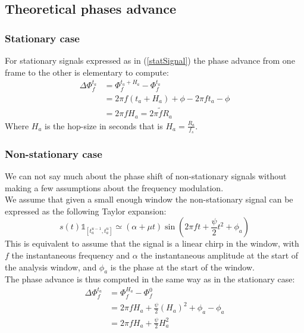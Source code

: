 \documentclass[]{article}
\begin{document}
\subsection{Theoretical phases advance}\label{theoretical_phase_advance}
\subsubsection{Stationary case}
For stationary signals expressed as in (\ref{statSignal}) the phase advance from one frame to the other is elementary to compute:
\begin{equation}\label{phaseAdvanceStat}
\begin{split}
\Delta \Phi_{f}^{t_a} & = \Phi_{f}^{t_a + H_a} - \Phi_{f}^{t_a}\\
& = 2\pi f (t_a + H_a) + \phi - 2\pi f t_a - \phi\\
& = 2\pi f H_a = 2\pi \tilde{f} R_a
\end{split}
\end{equation}
Where $H_a$ is the hop-size in seconds that is $H_a = \frac{R_a}{f_s}$.
\subsubsection{Non-stationary case}
We can not say much about the phase shift of non-stationary signals without making a few assumptions about the frequency modulation.\\
We assume that given a small enough window the non-stationary signal can be expressed as the following Taylor expansion:
\begin{equation}
s(t) \mathds{1}_{[t_a^{u-1}, t_a^u]} \simeq (\alpha + \mu t) \sin(2\pi f t + \frac{\psi}{2} t^2 + \phi_a)
\end{equation}
This is equivalent to assume that the signal is a linear chirp in the window, with $f$ the instantaneous frequency and $\alpha$ the instantaneous amplitude at the start of the analysis window, and $\phi_a$ is the phase at the start of the window.\\
The phase advance is thus computed in the same way as in the stationary case:
\begin{equation}\label{phaseadvanceNonStat}
\begin{split}
\Delta \Phi_{f}^{t_a} & = \Phi_{f}^{H_a} - \Phi_{f}^{0}\\
& = 2\pi f H_a + \frac{\psi}{2} (H_a)^2 + \phi_a - \phi_a\\
& = 2\pi f H_a + \frac{\psi}{2}H_a^2
\end{split}
\end{equation}

\newpage


\end{document}
